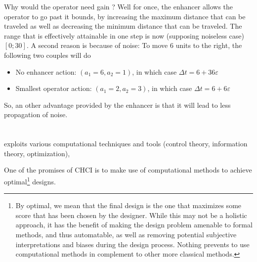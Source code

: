 \documentclass[12pt,a4paper]{article}
\begin{document}
Why would the operator need gain ? Well for once, the enhancer allows the operator to go past it bounds, by increasing the maximum distance that can be traveled as well as decreasing the minimum distance that can be traveled. The range that is effectively attainable in one step is now (supposing noiseless case) $[0;30]$.
A second reason is because of noise: To move 6 units to the right, the following two couples will do 
	
\begin{itemize}
	\item No enhancer action: $(a_1 = 6, a_2 = 1)$, in which case $\Delta t = 6 + 36 \varepsilon$
	\item Smallest operator action: $(a_1 = 2, a_2 = 3)$, in which case $\Delta t = 6 + 6\varepsilon$
\end{itemize}		
\noindent So, an other advantage provided by the enhancer is that it will lead to less propagation of noise.

\section{}

exploits various computational techniques and tools (control theory, information theory, optimization), 





One of the promises of CHCI is to make use of computational methods to achieve optimal\footnote{By optimal, we mean that the final design is the one that maximizes some score that has been chosen by the designer. While this may not be a holistic approach, it has the benefit of making the design problem amenable to formal methods, and thus automatable, as well as removing potential subjective interpretations and biases during the design process. Nothing prevents to use computational methods in complement to other more classical methods.} designs.
\end{document}
